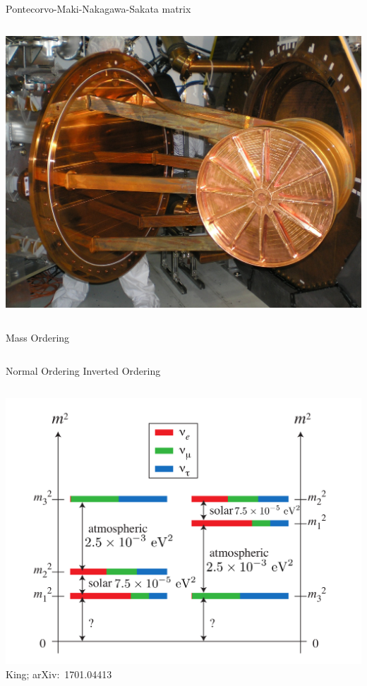 \documentclass[]{beamer}
\begin{document}
\begin{frame}{Pontecorvo-Maki-Nakagawa-Sakata matrix}
\begin{columns}[c]
		\centering
		\includegraphics[width=\textwidth]{defence/exo}
	\end{columns}
\end{frame}

\begin{frame}{Mass Ordering}
	\begin{columns}[c]
		\centering
		Normal Ordering
		\centering
		Inverted Ordering
	\end{columns}
	\centering
	\includegraphics[height=.8\textheight]{nu-detection/mass}\\
	{\tiny King; arXiv:~1701.04413~\cite{king}}\\
\end{frame}
\end{document}
